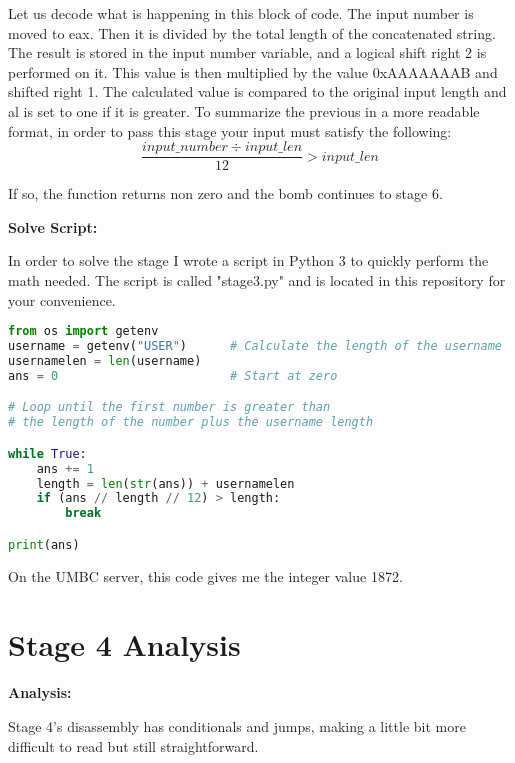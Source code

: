 \documentclass{article}
\begin{document}
Let us decode what is happening in this block of code.  The input number is 
moved to eax.  Then it is divided by the total length of the concatenated
string.  The result is stored in the input number variable, and a logical 
shift right 2 is performed on it.  This value is then multiplied by the value
0xAAAAAAAB and shifted right 1.  The calculated value is compared to the 
original input length and al is set to one if it is greater.  To summarize 
the previous in a more readable format, in order to pass this stage your input
must satisfy the following:
\[ \frac{input\_number\div input\_len}{12} > input\_len\]
\par
If so, the function returns non zero and the bomb continues to stage 6.

\begin{flushleft}
\textbf{Solve Script:}
\vspace{.5pc}
\end{flushleft}
\par
In order to solve the stage I wrote a script in Python 3 to quickly perform 
the math needed.  The script is called "stage3.py" and is located in this
repository for your convenience.  

\begin{lstlisting}[language=Python]
from os import getenv
username = getenv("USER")      # Calculate the length of the username
usernamelen = len(username)
ans = 0                        # Start at zero

# Loop until the first number is greater than
# the length of the number plus the username length

while True:
    ans += 1                   
    length = len(str(ans)) + usernamelen   
    if (ans // length // 12) > length:
        break

print(ans)
\end{lstlisting}
\par
On the UMBC server, this code gives me the integer value 1872.

\newpage
\section{Stage 4 Analysis}
\begin{flushleft}
\vspace{.5pc}
\end{flushleft}

\begin{flushleft}
\textbf{Analysis:}
\vspace{.5pc}
\end{flushleft}
\par
Stage 4's disassembly has conditionals and jumps, making a little bit more
difficult to read but still straightforward.
\end{document}
